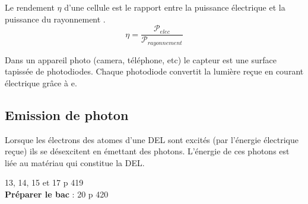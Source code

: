 Le rendement $\eta$ d'une cellule est le rapport entre la puissance électrique  et la puissance du rayonnement . $$\eta=\frac{\mathcal{P}_{elec}}{\mathcal{P}_{rayonnement}}$$


Dans un appareil photo (camera, téléphone, etc) le capteur est une surface tapissée de photodiodes. Chaque photodiode convertit la lumière reçue en courant électrique grâce à e.

\subsection{Emission de photon}

Lorsque les électrons des atomes d'une DEL sont excités (par l'énergie électrique reçue) ils se désexcitent en émettant des photons. L'énergie de ces photons est liée au matériau qui constitue la DEL. 


13, 14, 15 et 17 p 419
\\ \textbf{Préparer le bac} : 20 p 420
